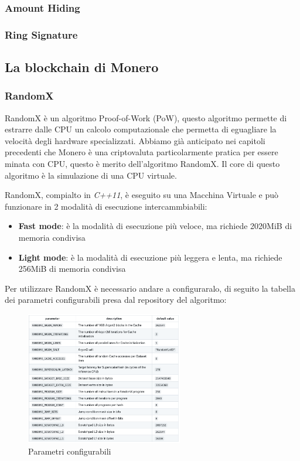 \documentclass[12pt,a4paper]{article}
\begin{document}
\subsubsection{Amount Hiding}



\subsubsection{Ring Signature}

\subsection{La blockchain di Monero}

\subsubsection{RandomX}
RandomX è un algoritmo Proof-of-Work (PoW), questo algoritmo permette di
estrarre dalle CPU un calcolo computazionale che permetta di eguagliare la
velocità degli hardware specializzati. Abbiamo già anticipato nei capitoli
precedenti che Monero è una criptovaluta particolarmente pratica per essere
minata con CPU, questo è merito dell'algoritmo RandomX. Il core di questo
algoritmo è la simulazione di una CPU virtuale.

RandomX, compialto in \textit{C++11}, è eseguito su una Macchina Virtuale e può
funzionare in 2 modalità di esecuzione intercammbiabili:

\begin{itemize}
    \item \textbf{Fast mode}: è la modalità di esecuzione più veloce, ma
    richiede 2020MiB di memoria condivisa
    \item \textbf{Light mode}: è la modalità di esecuzione più leggera e lenta,
    ma richiede 256MiB di memoria condivisa
\end{itemize}

Per utilizzare RandomX è necessario andare a configuraralo, di seguito la
tabella dei parametri configurabili presa dal repository del algoritmo:

\begin{figure}[h]
    \centering
    \includegraphics[width=0.61\textwidth]{./images/randomx_parameters.png}
    \caption{Parametri configurabili}
    \label{fig:parameters}
\end{figure}
\end{document}
